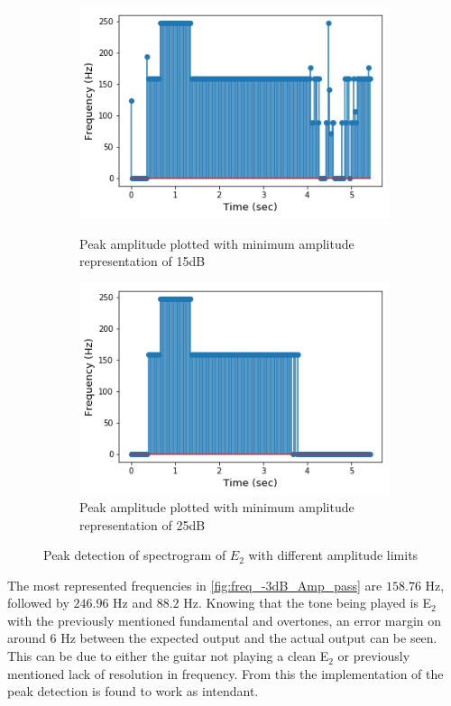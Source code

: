 \begin{figure}[H]
\begin{subfigure}{0.49\textwidth}
\end{subfigure}
\begin{subfigure}{0.49\textwidth}
\centering
\includegraphics[width=\textwidth]{figures/peak_detection/20170511_15.png}
\caption{Peak amplitude plotted with minimum amplitude representation of 15dB}
\label{fig:freq_15dB_Amp_pass}

\includegraphics[width=\textwidth]{figures/peak_detection/20170511_25.png}
\caption{Peak amplitude plotted with minimum amplitude representation of 25dB}
\label{fig:freq_25dB_Amp_pass}

\end{subfigure}
\caption{Peak detection of spectrogram of $E_2$ with different amplitude limits}
\label{fig:valdation_peak_detection}
\end{figure}

The most represented frequencies in \ref{fig:freq_-3dB_Amp_pass} are $158.76$ Hz, followed by $246.96$ Hz and $88.2$ Hz. 
Knowing that the tone being played is E$_2$ with the previously mentioned fundamental and overtones, an error margin on around $6$ Hz between the expected output and the actual output can be seen.
This can be due to either the guitar not playing a clean E$_2$ or previously mentioned lack of resolution in frequency. From this the implementation of the peak detection is found to work as intendant.\\

